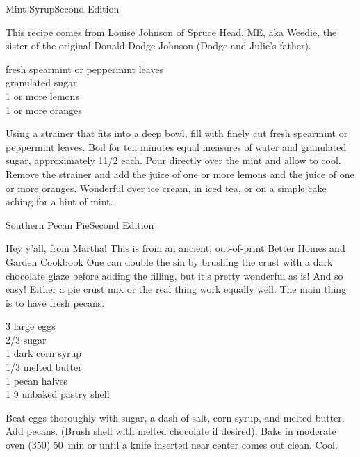 
\begin{entry}{Mint Syrup}{Second Edition}

\begin{open}
  This recipe comes from Louise Johnson of Spruce Head, ME, aka Weedie, the
  sister of the original Donald Dodge Johnson (Dodge and Julie’s father).
\end{open}
\begin{ingredients}
    fresh spearmint or peppermint leaves\\
    granulated sugar\\
    1 or more lemons\\
    1 or more oranges
\end{ingredients}
Using a strainer that fits into a deep bowl, fill with finely cut fresh
spearmint or peppermint leaves. Boil for ten minutes equal measures of water
and granulated sugar, approximately 1\SI{1/2}{\cup} each. Pour directly over
the mint and allow to cool. Remove the strainer and add the juice of one or
more lemons and the juice of one or more oranges. Wonderful over ice cream, in
iced tea, or on a simple cake aching for a hint of mint.
\end{entry}

\begin{entry}{Southern Pecan Pie}{Second Edition}
\label{sec:pecanpie}

\begin{open}
  Hey y'all, from Martha! This is from an ancient, out-of-print Better Homes
  and Garden Cookbook One can double the sin by brushing the crust with a dark
  chocolate glaze before adding the filling, but it's pretty wonderful as is!
  And so easy! Either a pie crust mix or the real thing work equally well. The
  main thing is to have fresh pecans.
\end{open}
\begin{ingredients}
    3 large eggs\\
    \SI{2/3}{\cup} sugar\\
    \SI{1}{\cup} dark corn syrup\\
    \SI{1/3}{\cup} melted butter\\
    \SI{1}{\cup} pecan halves\\
    1 \SI{9}{\inch} unbaked pastry shell
\end{ingredients}
Beat eggs thoroughly with sugar, a dash of salt, corn syrup, and melted butter.
Add pecans. (Brush shell with melted chocolate if desired). Bake in moderate
oven (\SI{350}{\degreeF}) \SI{50}{\minute} or until a knife inserted near center
comes out clean. Cool.
\end{entry}

